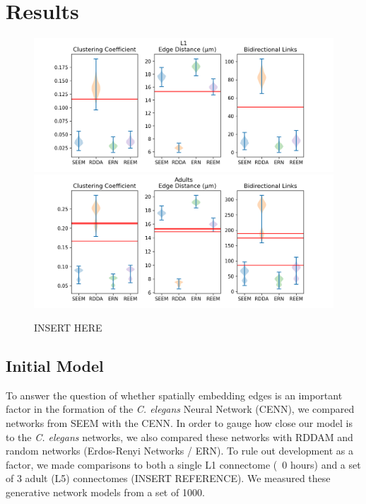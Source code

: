 \section{Results}

\begin{figure}[h]
  \includegraphics[width=0.49\linewidth]{../data/images/stats/L1.png}
  \includegraphics[width=0.49\linewidth]{../data/images/stats/Adults.png}
  \caption{INSERT HERE}
\end{figure}


\subsection{Initial Model}

To answer the question of whether spatially embedding edges is an important factor in the formation of the \textit{C. elegans} Neural Network (CENN), we compared networks from SEEM with the CENN. In order to gauge how close our model is to the \textit{C. elegans} networks, we also compared these networks with RDDAM and random networks (Erdos-Renyi Networks / ERN). To rule out development as a factor, we made comparisons to both a single L1 connectome (~0 hours) and a set of 3 adult (L5) connectomes (INSERT REFERENCE). We measured these generative network models from a set of 1000.

